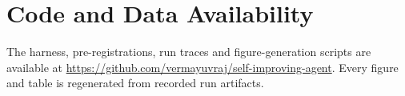 \documentclass{article}
\begin{document}
\section*{Code and Data Availability}

The harness, pre-registrations, run traces and figure-generation scripts are
available at
\url{https://github.com/vermayuvraj/self-improving-agent}.
Every figure and table is regenerated from recorded run artifacts.



\end{document}
